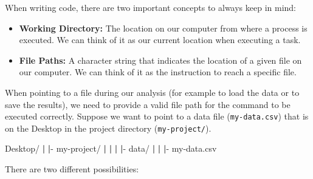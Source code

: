 \documentclass[
  11pt,
]{book}
\newenvironment{Shaded}{\begin{snugshade}}{\end{snugshade}}
\newcommand{\ExtensionTok}[1]{#1}
\newcommand{\KeywordTok}[1]{\textcolor[rgb]{0.13,0.29,0.53}{\textbf{#1}}}
\newcommand{\NormalTok}[1]{#1}
\providecommand{\tightlist}{%
  \setlength{\itemsep}{0pt}\setlength{\parskip}{0pt}}
\begin{document}
When writing code, there are two important concepts to always keep in mind:

\begin{itemize}
\tightlist
\item
  \textbf{Working Directory:} The location on our computer from where a process is executed. We can think of it as our current location when executing a task.
\item
  \textbf{File Paths:} A character string that indicates the location of a given file on our computer. We can think of it as the instruction to reach a specific file.
\end{itemize}

When pointing to a file during our analysis (for example to load the data or to save the results), we need to provide a valid file path for the command to be executed correctly. Suppose we want to point to a data file (\texttt{my-data.csv}) that is on the Desktop in the project directory (\texttt{my-project/}).

\begin{Shaded}
\begin{Highlighting}[]
\ExtensionTok{Desktop/}
 \KeywordTok{|}
 \KeywordTok{|}\ExtensionTok{{-}}\NormalTok{  my{-}project/}
 \KeywordTok{|}    \KeywordTok{|}
 \KeywordTok{|}    \KeywordTok{|}\ExtensionTok{{-}}\NormalTok{ data/}
 \KeywordTok{|}    \KeywordTok{|}   \KeywordTok{|}\ExtensionTok{{-}}\NormalTok{ my{-}data.csv}
\end{Highlighting}
\end{Shaded}

There are two different possibilities:
\end{document}
